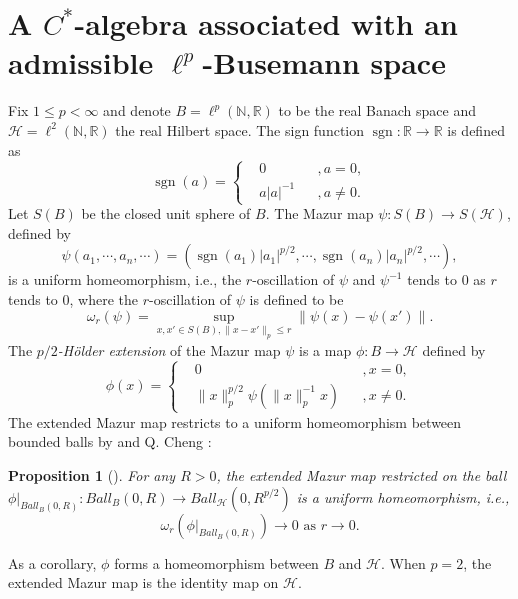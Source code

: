 \documentclass{article}
\theoremstyle{plain}
\newtheorem{proposition}[theorem]{Proposition}
\theoremstyle{definition}
\theoremstyle{remark}
\def\H{\mathcal H}
\def\IR{\mathbb R}
\def\IN{\mathbb N}
\begin{document}
	\section{A $C^*$-algebra associated with an admissible $\ell^p$-Busemann space}
	
	Fix $1\leq p<\infty$ and denote $B=\ell^p(\IN,\IR)$ to be the real Banach space and $\H=\ell^2(\IN,\IR)$ the real Hilbert space. The sign function $\operatorname{sgn}:\IR\to\IR$ is defined as
	$$\operatorname{sgn}(a)=\left\{\begin{aligned}&0&&,a=0,\\&a|a|^{-1}&&,a\ne0.\end{aligned}\right.$$
	Let $S(B)$ be the closed unit sphere of $B$. The Mazur map $\psi:S(B)\to S(\H)$, defined by
	$$\psi(a_1,\cdots,a_n,\cdots)=(\operatorname{sgn}(a_1)|a_1|^{p/2},\cdots,\operatorname{sgn}(a_n)|a_n|^{p/2},\cdots),$$
	is a uniform homeomorphism, i.e., the $r$-oscillation of $\psi$ and $\psi^{-1}$ tends to $0$ as $r$ tends to $0$, where the $r$-oscillation of $\psi$ is defined to be
	$$\omega_r(\psi)=\sup_{x,x'\in S(B),\|x-x'\|_p\leq r}\|\psi(x)-\psi(x')\|.$$
	The \emph{$p/2$-Hölder extension} of the Mazur map $\psi$ is a map $\phi:B\to\H$ defined by 
	$$\phi(x)=\left\{\begin{aligned}&0&&,x=0,\\&\|x\|^{p/2}_p\psi\left(\|x\|_p^{-1}x\right)&&,x\ne0.\end{aligned}\right.$$
	The extended Mazur map restricts to a uniform homeomorphism between bounded balls by \cite[Proposition 2.9]{OdellSchlumprecht1994} and Q. Cheng \cite[Theorem 2.4]{Cheng2016}:
	
	\begin{proposition}[\cite{OdellSchlumprecht1994,Cheng2016}]\label{extend Mazur uniform homeo}
		For any $R>0$, the extended Mazur map restricted on the ball $\phi|_{Ball_B(0,R)}:Ball_B(0,R)\to Ball_{\H}(0,R^{p/2})$ is a uniform homeomorphism, i.e.,
		$$\omega_r\left(\phi|_{Ball_B(0,R)}\right)\to 0\text{ as }r\to 0.$$
	\end{proposition}
	
	As a corollary, $\phi$ forms a homeomorphism between $B$ and $\H$. When $p=2$, the extended Mazur map is the identity map on $\H$.
	
\end{document}
